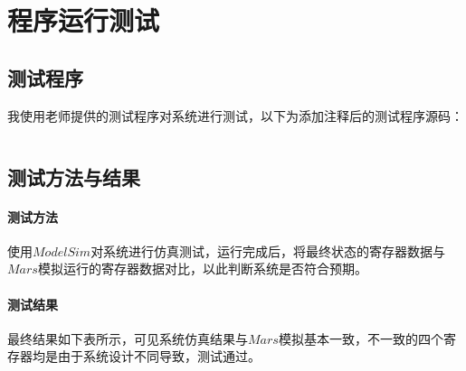 \documentclass[main.tex]{subfiles}
\begin{document}
\section{程序运行测试}

\subsection{测试程序}
我使用老师提供的测试程序对系统进行测试，以下为添加注释后的测试程序源码：
\inputminted[linenos]{gas}{Project2/p2-test-commented.asm}

\clearpage

\subsection{测试方法与结果}

\paragraph{测试方法}
使用$ModelSim$对系统进行仿真测试，运行完成后，将最终状态的寄存器数据与$Mars$模拟运行的寄存器数据对比，以此判断系统是否符合预期。

\paragraph{测试结果}
最终结果如下表所示，可见系统仿真结果与$Mars$模拟基本一致，不一致的四个寄存器均是由于系统设计不同导致，测试通过。
\end{document}
